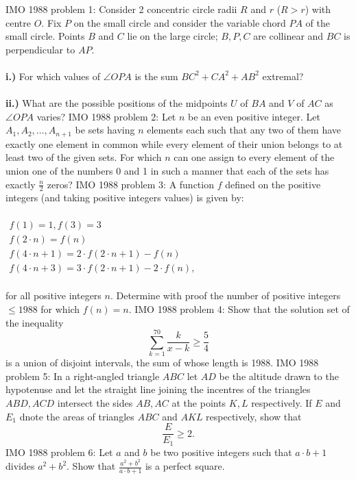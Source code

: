 IMO 1988 problem 1:  Consider 2 concentric circle radii $ R$ and  $ r$ ($ R > r$) with centre $ O.$ Fix $ P$ on the small circle and consider the variable chord $ PA$ of the small circle. Points $ B$ and $ C$ lie on the large circle; $ B,P,C$ are collinear and $ BC$ is perpendicular to $ AP.$ \\\\
\textbf{i.)} For which values of $ \angle OPA$ is the sum $ BC^2 + CA^2 + AB^2$ extremal? \\\\
\textbf{ii.)} What are the possible positions of the midpoints $ U$ of $ BA$ and $ V$ of $ AC$ as $ \angle OPA$ varies? 
IMO 1988 problem 2:  Let $ n$ be an even positive integer. Let $ A_1, A_2, \ldots, A_{n + 1}$ be sets having $ n$ elements each such that any two of them have exactly one element in common while every element of their union belongs to at least two of the given sets. For which $ n$ can one assign to every element of the union one of the numbers 0 and 1 in such a manner that each of the sets has exactly $ \frac {n}{2}$ zeros? 
IMO 1988 problem 3:  A function $ f$ defined on the positive integers (and taking positive integers values) is given by: \\\\
$
\begin{matrix} f(1) = 1, f(3) = 3 \\
f(2 \cdot n) = f(n) \\
f(4 \cdot n + 1) = 2 \cdot f(2 \cdot n + 1) - f(n) \\
f(4 \cdot n + 3) = 3 \cdot f(2 \cdot n + 1) - 2 \cdot f(n), \end{matrix}
$ \\\\
for all positive integers $ n.$ Determine with proof the number of positive integers $ \leq 1988$ for which $ f(n) = n.$ 
IMO 1988 problem 4:  Show that the solution set of the inequality
\[ \sum^{70}_{k = 1} \frac {k}{x - k} \geq \frac {5}{4} \]
is a union of disjoint intervals, the sum of whose length is 1988. 
IMO 1988 problem 5:  In a right-angled triangle $ ABC$ let $ AD$ be the altitude drawn to the hypotenuse and let the straight line joining the incentres of the triangles $ ABD, ACD$ intersect the sides $ AB, AC$ at the points $ K,L$ respectively. If $ E$ and $ E_1$ dnote the areas of triangles $ ABC$ and $ AKL$ respectively, show that
\[ \frac {E}{E_1} \geq 2. \] 
IMO 1988 problem 6:  Let $ a$ and $ b$ be two positive integers such that $ a \cdot b + 1$ divides $ a^2 + b^2$. Show that $ \frac {a^2 + b^2}{a \cdot b + 1}$ is a perfect square. 

